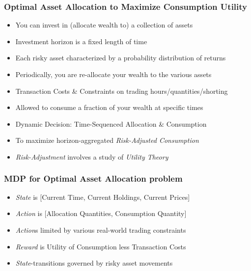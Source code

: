 \documentclass[handout]{beamer}
\begin{document}
\begin{frame}
\frametitle{Optimal Asset Allocation to Maximize Consumption Utility}
\pause
\begin{itemize}[<+->]
\item You can invest in (allocate wealth to) a collection of assets
\item Investment horizon is a fixed length of time
\item Each risky asset characterized by a probability distribution of returns
\item Periodically, you are re-allocate your wealth to the various assets
\item Transaction Costs \& Constraints on trading hours/quantities/shorting
\item Allowed to consume a fraction of your wealth at specific times
\item Dynamic Decision: Time-Sequenced Allocation \& Consumption
\item To maximize horizon-aggregated {\em Risk-Adjusted Consumption}
\item {\em Risk-Adjustment} involves a study of {\em Utility Theory}
\end{itemize}
\end{frame}



\begin{frame}
\frametitle{MDP for Optimal Asset Allocation problem}
\pause
\begin{itemize}[<+->]
\item {\em State} is [Current Time, Current Holdings, Current Prices]
\item {\em Action} is [Allocation Quantities, Consumption Quantity]
\item {\em Action}s limited by various real-world trading constraints
\item {\em Reward} is Utility of Consumption less Transaction Costs
\item {\em State}-transitions governed by risky asset movements
\end{itemize}
\end{frame}
\end{document}
